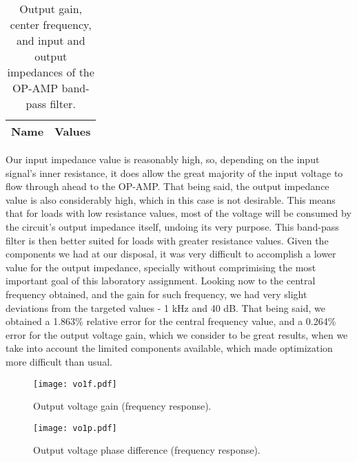 \begin{table}[h]
  \centering
  \begin{tabular}{|l|r|}
    \hline    
    {\bf Name} & {\bf Values} \\ \hline
    
         
  \end{tabular}
  \caption{Output gain, center frequency, and input and output impedances of the OP-AMP band-pass filter.}
  \label{tab:main}
\end{table}

Our input impedance value is reasonably high, so, depending on the input signal's inner resistance, it does allow the great majority of the input voltage to flow 
through ahead to the OP-AMP. That being said, the output impedance value is also considerably high, which in this case is not desirable. This means 
that for loads with low resistance values, most of the voltage will be consumed by the circuit's output impedance itself, undoing its very purpose. 
This band-pass filter is then better suited for loads with greater resistance values. Given the components we had at our disposal, it was very difficult 
to accomplish a lower value for the output impedance, specially without comprimising the most important goal of this laboratory assignment.
Looking now to the central frequency obtained, and the gain for such frequency, we had very slight deviations from the targeted values - 1 kHz and 40 dB. 
That being said, we obtained a 1.863\% relative error for the central frequency value, and a 0.264\% error for the output voltage gain, which we consider to be 
great results, when we take into account the limited components available, which made optimization more difficult than usual.

\begin{figure}[h!] \centering
\texttt{[image: vo1f.pdf]}
\caption{Output voltage gain (frequency response).}
\label{fig:gainstage}
\end{figure}

\begin{figure}[h!] \centering
\texttt{[image: vo1p.pdf]}
\caption{Output voltage phase difference (frequency response).}
\label{fig:outputstage}
\end{figure}

